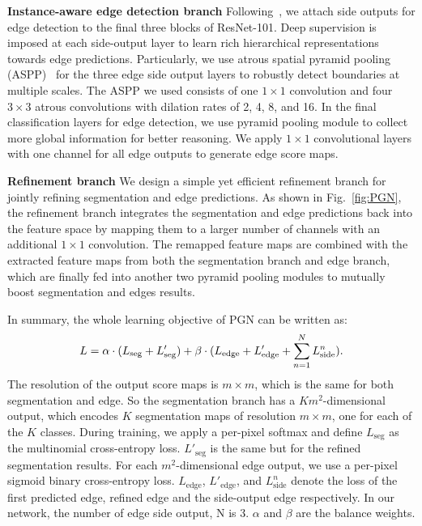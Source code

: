 \documentclass[runningheads]{llncs}
\begin{document}
\textbf{Instance-aware edge detection branch}
Following~\cite{xie2015holistically}, we attach side outputs for edge detection to the final three blocks of ResNet-101. Deep supervision is imposed at each side-output layer to learn rich hierarchical representations towards edge predictions. Particularly, we use atrous spatial pyramid pooling (ASPP)~\cite{chen2016deeplab} for the three edge side output layers to robustly detect boundaries at multiple scales. The ASPP we used consists of one $1\times1$ convolution and four $3\times3$ atrous convolutions with dilation rates of 2, 4, 8, and 16. In the final classification layers for edge detection, we use pyramid pooling module to collect more global information for better reasoning. We apply $1\times1$ convolutional layers with one channel for all edge outputs to generate edge score maps.


\textbf{Refinement branch}
We design a simple yet efficient refinement branch for jointly refining segmentation and edge predictions. As shown in Fig.~\ref{fig:PGN}, the refinement branch integrates the segmentation and edge predictions back into the feature space by mapping them to a larger number of channels with an additional $1\times1$ convolution. The remapped feature maps are combined with the extracted feature maps from both the segmentation branch and edge branch, which are finally fed into another two pyramid pooling modules to mutually boost segmentation and edges results.

In summary, the whole learning objective of PGN can be written as:
\begin{equation}
\vspace{-2mm}
L = \alpha \cdot (L_{\text{seg}} + L'_{\text{seg}}) + \beta \cdot (L_{\text{edge}} + L'_{\text{edge}} + \sum \limits_{n=1}^N L_{\text{side}}^n).
\end{equation}
The resolution of the output score maps is $m\times m$, which is the same for both segmentation and edge. So the segmentation branch has a $Km^2$-dimensional output, which encodes $K$ segmentation maps of resolution $m \times m$, one for each of the $K$ classes. During training, we apply a per-pixel softmax and define $L_{\text{seg}}$ as the multinomial cross-entropy loss. $L'_{\text{seg}}$ is the same but for the refined segmentation results. For each $m^2$-dimensional edge output, we use a per-pixel sigmoid binary cross-entropy loss. $L_{\text{edge}}$, $L'_{\text{edge}}$, and $L_{\text{side}}^n$ denote the loss of the first predicted edge, refined edge and the side-output edge respectively. In our network, the number of edge side output, N is 3. $\alpha$ and $\beta$ are the balance weights.
\end{document}
